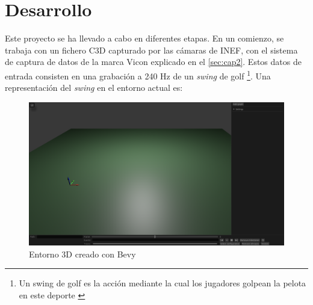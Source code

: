


\chapter{Desarrollo} \label{sec:cap3}


\noindent Este proyecto se ha llevado a cabo en diferentes etapas. En un comienzo, se trabaja con un fichero C3D capturado por las cámaras de INEF, con el sistema de captura de datos de la marca Vicon explicado en el \autoref{sec:cap2}. Estos datos de entrada consisten en una grabación a 240 Hz de un \textit{swing} de golf \footnote{Un swing de golf es la acción mediante la cual los jugadores golpean la pelota en este deporte \autocite{GolfSwing2025}}. Una representación del \textit{swing} en el entorno actual es:


\begin{figure}[H]
  \centering
  \includegraphics[width=\textwidth]{imagenes/entorno3D.png}
  \caption{Entorno 3D creado con Bevy}
  \label{fig:entorno3D}
\end{figure}